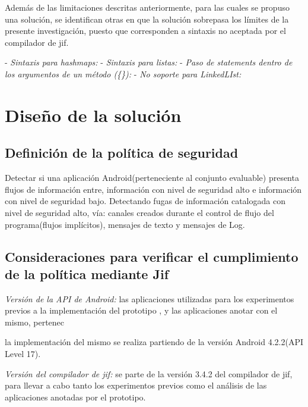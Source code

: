 Además de las limitaciones descritas anteriormente, para las cuales se propuso
una solución, se identifican otras en que la solución sobrepasa los límites de
la presente investigación, puesto que corresponden a sintaxis no aceptada por el
compilador de jif.\newline

- \textit{Sintaxis para hashmaps:}\newline 
- \textit{Sintaxis para listas:}\newline 
- \textit{Paso de statements dentro de los argumentos de un método
(\{\}):}\newline
- \textit{No soporte para LinkedLIst:}\newline

\section{Diseño de la solución} 
\subsection{Definición de la política de seguridad}
Detectar si una aplicación Android(perteneciente al conjunto evaluable) presenta
flujos de información entre, información con nivel de seguridad alto e
información con nivel de seguridad bajo.\newline 
Detectando fugas de información catalogada con nivel de seguridad alto, vía:
canales creados durante el control de flujo del programa(flujos implícitos),
mensajes de texto y mensajes de Log.\newline 

\subsection{Consideraciones para verificar el cumplimiento de la política
mediante Jif} 
\textit{Versión de la API de Android:}\newline
las aplicaciones utilizadas para los experimentos previos a la implementación
del prototipo , y las aplicaciones anotar con el mismo, pertenec


la implementación
del mismo se realiza partiendo de la versión Android 4.2.2(API Level 17).

\textit{Versión del compilador de jif:}\newline
se parte de la versión 3.4.2 del compilador de jif, para llevar a cabo tanto los
experimentos previos como el análisis de las aplicaciones anotadas por el
prototipo.

